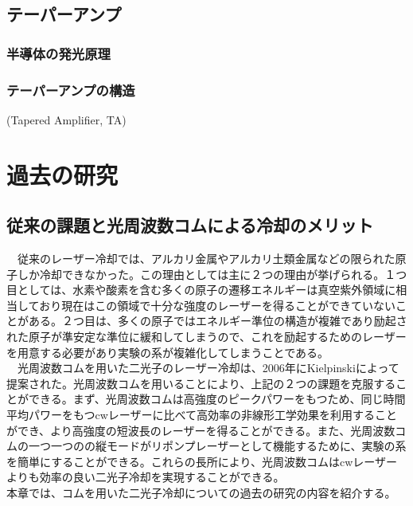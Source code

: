 \documentclass[uplatex,dvipdfmx,a4paper,report,papersize,11pt]{jsbook}
\begin{document}
\section{テーパーアンプ}
\subsection{半導体の発光原理}
\subsection{テーパーアンプの構造}
(Tapered Amplifier, TA)

\chapter{過去の研究}
\section{従来の課題と光周波数コムによる冷却のメリット}

　従来のレーザー冷却では、アルカリ金属やアルカリ土類金属などの限られた原子しか冷却できなかった。この理由としては主に２つの理由が挙げられる。１つ目としては、水素や酸素を含む多くの原子の遷移エネルギーは真空紫外領域に相当しており現在はこの領域で十分な強度のレーザーを得ることができていないことがある。２つ目は、多くの原子ではエネルギー準位の構造が複雑であり励起された原子が準安定な準位に緩和してしまうので、これを励起するためのレーザーを用意する必要があり実験の系が複雑化してしまうことである\cite{PhysRevA.73.063407}。\\
　光周波数コムを用いた二光子のレーザー冷却は、2006年にKielpinski\cite{PhysRevA.73.063407}によって提案された。光周波数コムを用いることにより、上記の２つの課題を克服することができる。まず、光周波数コムは高強度のピークパワーをもつため、同じ時間平均パワーをもつcwレーザーに比べて高効率の非線形工学効果を利用することができ、より高強度の短波長のレーザーを得ることができる。また、光周波数コムの一つ一つのの縦モードがリポンプレーザーとして機能するために、実験の系を簡単にすることができる。これらの長所により、光周波数コムはcwレーザーよりも効率の良い二光子冷却を実現することができる\cite{PhysRevA.73.063407}。\\
 本章では、コムを用いた二光子冷却についての過去の研究の内容を紹介する。
\end{document}
